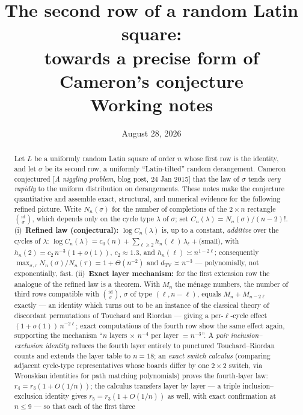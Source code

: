 \documentclass[11pt]{article}
\title{The second row of a random Latin square:\\
towards a precise form of Cameron's conjecture\\[4pt]
\large Working notes}
\author{}
\date{August 28, 2026}
\theoremstyle{definition}
\newcommand{\dtv}{d_{\mathrm{TV}}}
\newcommand{\CC}{C}
\begin{document}
\maketitle

\begin{abstract}
\noindent
Let $L$ be a uniformly random Latin square of order $n$ whose first row is the
identity, and let $\sigma$ be its second row, a uniformly ``Latin-tilted''
random derangement.  Cameron conjectured
[\emph{A niggling problem}, blog post, 24 Jan 2015] that the law of $\sigma$
tends \emph{very rapidly} to the uniform distribution on derangements.  These
notes make the conjecture quantitative and assemble exact, structural, and
numerical evidence for the following refined picture.  Write $N_n(\sigma)$ for
the number of completions of the $2\times n$ rectangle
$\binom{\mathrm{id}}{\sigma}$, which depends only on the cycle type
$\lambda$ of $\sigma$; set $\CC_n(\lambda)=N_n(\sigma)/(n-2)!$.
(i)~\textbf{Refined law (conjectural):} $\log \CC_n(\lambda)$ is, up to a
constant, \emph{additive} over the cycles of $\lambda$:
$\log \CC_n(\lambda)= c_0(n)+\sum_{\ell\ge 2}h_n(\ell)\,\lambda_\ell + \text{(small)}$,
with $h_n(2)= c_2\,n^{-3}(1+o(1))$, $c_2\approx 1.3$, and
$h_n(\ell)\asymp n^{1-2\ell}$; consequently
$\max_{\sigma,\tau}N_n(\sigma)/N_n(\tau)= 1+\Theta(n^{-2})$ and
$\dtv \asymp n^{-3}$ --- polynomially, not exponentially, fast.
(ii)~\textbf{Exact layer mechanism:} for the first extension row the analogue
of the refined law is a theorem.  With $M_n$ the m\'enage numbers, the number
of third rows compatible with $\binom{\mathrm{id}}{\sigma}$, $\sigma$ of type
$(\ell,n-\ell)$, equals $M_n+M_{n-2\ell}$ exactly --- an identity which turns
out to be an instance of the classical theory of discordant permutations of
Touchard and Riordan --- giving a per-$\ell$-cycle effect
$(1+o(1))\,n^{-2\ell}$; exact computations of the fourth row show the same
effect again, supporting the mechanism
``$n$ layers $\times$ $n^{-4}$ per layer $= n^{-3}$''.  A \emph{pair
inclusion--exclusion identity} reduces the fourth layer entirely to
punctured Touchard--Riordan counts and extends the layer table to $n=18$;
an \emph{exact switch calculus} (comparing adjacent cycle-type
representatives whose boards differ by one $2\times2$ switch, via
Wronskian identities for path matching polynomials) proves the
fourth-layer law: $r_4=r_3(1+O(1/n))$; the calculus transfers layer by
layer --- a triple inclusion--exclusion identity gives
$r_5=r_3(1+O(1/n))$ as well, with exact confirmation at $n\le9$ --- so
that each of the first three

\end{abstract}
\end{document}

